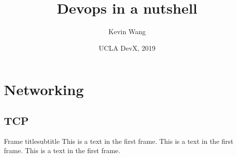 \documentclass{beamer}
\title[Devops Series]{Devops in a nutshell}
\author{Kevin Wang}
\date[DevX 2019]{UCLA DevX, 2019}
\begin{document}
\maketitle

\section{Networking}

\subsection{TCP}

\begin{frame}{Frame title}{subtitle}
  This is a text in the first frame. This is a text in the first frame. This is a text in the first frame.
\end{frame}
\end{document}

